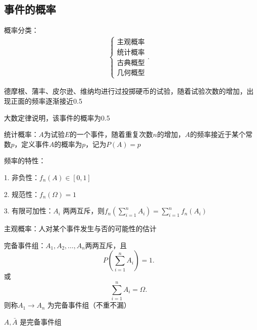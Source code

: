 \subsection{事件的概率}%
\label{sub:事件的概率}
概率分类：
\begin{align*}
    \begin{cases}
        \text{主观概率}\\ 
        \text{统计概率}\\
        \text{古典概型}\\
        \text{几何概型}
    \end{cases}
.\end{align*}
\begin{notation}
    德摩根、蒲丰、皮尔逊、维纳均进行过投掷硬币的试验，随着试验次数的增加，出现正面的频率逐渐接近0.5

    大数定律说明，该事件的概率为0.5
\end{notation}
\begin{defi}
    统计概率：$A$为试验$E$的一个事件，随着重复次数$n$的增加，$A$的频率接近于某个常数$p$，定义事件$A$的概率为$p$，记为$P\left( A \right) =p$
\end{defi}
频率的特性：

1. 非负性：$f_n\left( A \right) \in \left[ 0,1 \right] $

2. 规范性：$f_n\left( \Omega \right) =1$

3. 有限可加性：$A_i$ 两两互斥，则$f_n\left( \sum_{i=1}^{n} A_i \right) =\sum_{i=1}^{n} f_n\left( A_i \right) $
\begin{defi}
    主观概率：人对某个事件发生与否的可能性的估计
\end{defi}

\begin{defi}
    完备事件组：$A_1,A_2,\ldots,A_n$两两互斥，且\[
        P\left( \sum_{i=1}^{n} A_i \right) =1
    .\] 或\[
        \sum_{i=1}^{n} A_i=\Omega
    .\] 则称$A_1\to A_n$ 为完备事件组（不重不漏）
\end{defi}
\begin{eg}
    $A,\bar{A}$ 是完备事件组
\end{eg}
